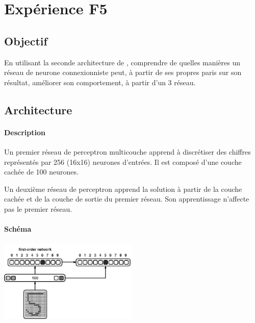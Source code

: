 \section{Expérience F5} 
  \subsection{Objectif}
    En utilisant la seconde architecture de \cite{Cleeremans_2007}, 
    comprendre de quelles manières un réseau de neurone connexionniste peut, à partir de ses propres paris
    sur son résultat, améliorer son comportement, à partir d'un 3 réseau.
  
  
     
  \subsection{Architecture}
    \paragraph{Description}
      Un premier réseau de perceptron multicouche apprend à discrétiser des chiffres représentés
      par 256 (16x16) neurones d'entrées. Il est composé d'une couche cachée de 100 neurones.
      
      Un deuxième réseau de perceptron apprend la solution à partir de la couche cachée et de la 
      couche de sortie du premier réseau. Son apprentissage n'affecte pas le premier réseau.


    \paragraph{Schéma}
      \begin{center}
	\includegraphics[width=250px]{data/expF5/schema.png}
      \end{center}
      
